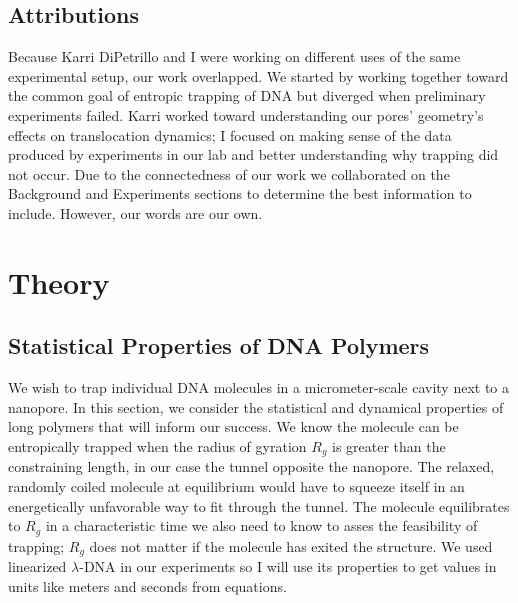 \documentclass[aps,prl,preprint,groupedaddress]{revtex4}
\begin{document}
\subsection{Attributions}
Because Karri DiPetrillo and I were working on different uses of the same experimental setup, our work overlapped.
We started by working together toward the common goal of entropic trapping of DNA but diverged when preliminary experiments failed.
Karri worked toward understanding our pores' geometry's effects on translocation dynamics; I focused on making sense of the data produced by experiments in our lab and better understanding why trapping did not occur.
Due to the connectedness of our work we collaborated on the Background and Experiments sections to determine the best information to include.
However, our words are our own.
\section{Theory}

\subsection{Statistical Properties of DNA Polymers}

We wish to trap individual DNA molecules in a micrometer-scale cavity next to a nanopore.
In this section, we consider the statistical and dynamical properties of long polymers that will inform our success. We know the molecule can be entropically trapped when the radius of gyration \(R_g\) is greater than the constraining length, in our case the tunnel opposite the nanopore.
The relaxed, randomly coiled molecule at equilibrium would have to squeeze itself in an energetically unfavorable way to fit through the tunnel.\cite{trapping}
The molecule equilibrates to \(R_g\) in a characteristic time we also need to know to asses the feasibility of trapping;
\(R_g\) does not matter if the molecule has exited the structure.
We used linearized \(\lambda\)-DNA in our experiments so I will use its properties to get values in units like meters and seconds from equations.
\end{document}
